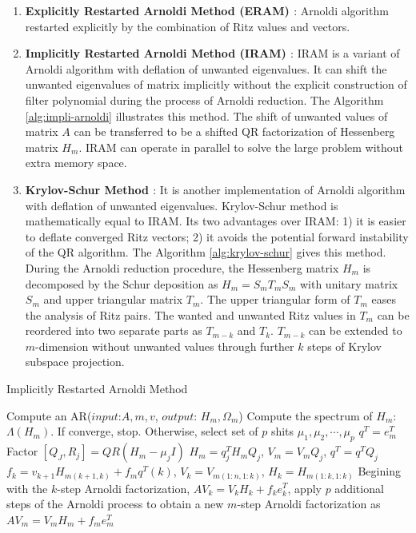 {\begin{enumerate}
	\item \textbf{Explicitly Restarted Arnoldi Method (ERAM) \cite{morgan1996restarting}}: Arnoldi algorithm restarted explicitly by the combination of Ritz values and vectors.
	
	\item \textbf{Implicitly Restarted Arnoldi Method (IRAM) \cite{sorensen1997implicitly}}: IRAM is a variant of Arnoldi algorithm with deflation of unwanted eigenvalues. It can shift the unwanted eigenvalues of matrix implicitly without the explicit construction of filter polynomial during the process of Arnoldi reduction. The Algorithm \ref{alg:impli-arnoldi} illustrates this method. The shift of unwanted values of matrix $A$ can be transferred to be a shifted QR factorization of Hessenberg matrix $H_m$. IRAM can operate in parallel to solve the large problem without extra memory space.
	
	\item \textbf{Krylov-Schur Method \cite{stewart2002krylov}}: It is another implementation of Arnoldi algorithm with deflation of unwanted eigenvalues. Krylov-Schur method is mathematically equal to IRAM. Its two advantages over IRAM: 1) it is easier to deflate converged Ritz vectors; 2) it avoids the potential forward instability of the QR algorithm. The Algorithm \ref{alg:krylov-schur} gives this method. During the Arnoldi reduction procedure, the Hessenberg matrix $H_m$ is decomposed by the Schur deposition as $H_m=S_mT_mS_m$ with unitary matrix $S_m$ and upper triangular matrix $T_m$. The upper triangular form of $T_m$ eases the analysis of Ritz pairs. The wanted and unwanted Ritz values in $T_m$ can be reordered into two separate parts as $T_{m-k}$ and $T_k$. $T_{m-k}$ can be extended to $m$-dimension without unwanted values through further $k$ steps of Krylov subspace projection. 
	
\end{enumerate}

\begin{algorithm}[t]{}
	\caption{Implicitly Restarted Arnoldi Method}   
	\label{alg:impli-arnoldi}   
	\begin{algorithmic}[1]
		\State Compute an AR($input$:$A,m,v$, $output$: $H_m, \Omega_m$)
		\State Compute the spectrum of $H_m$: $\Lambda (H_m)$. If converge, stop. Otherwise, select set of $p$ shits $\mu_1, \mu_2,\cdots, \mu_p$
		\State $q^T = e_m^T$
		\State Factor $[Q_J, R_j] = QR(H_m-\mu_jI)$
		\State $H_m = q_j^TH_mQ_j$, $V_m=V_mQ_j$, $q^T=q^TQ_j$
		\EndFor 
		\State $f_k=v_{k+1}H_{m(k+1,k)}+f_mq^T(k)$, $V_k=V_{m(1:n,1:k)}$, $H_k=H_{m(1:k,1:k)}$
		\State Begining with the $k$-step Arnoldi factorization, $AV_k=V_kH_k+f_ke_k^T$, apply $p$ additional steps of the Arnoldi process to obtain a new $m$-step Arnoldi factorization as $AV_m=V_mH_m+f_me_m^T$
		\EndFunction
	\end{algorithmic}  
\end{algorithm}

}
